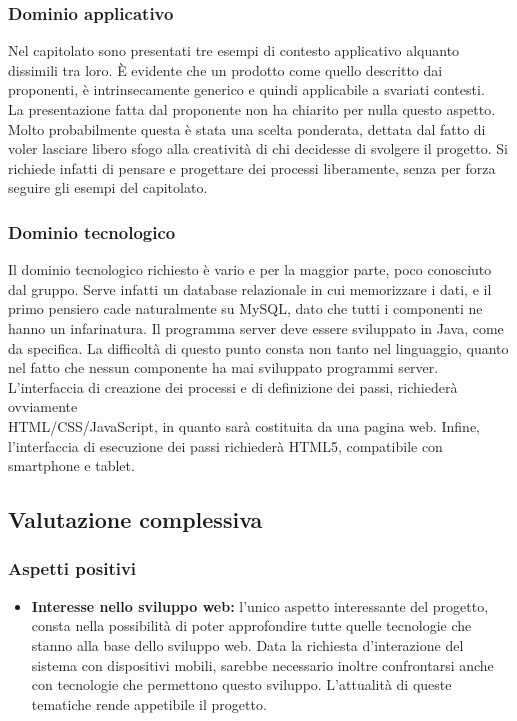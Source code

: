 \subsubsection{Dominio applicativo}
\label{dominioapp4}
Nel capitolato sono presentati tre esempi di contesto applicativo alquanto dissimili tra loro. \`E evidente che un prodotto come quello descritto dai proponenti, è intrinsecamente generico e quindi applicabile a svariati contesti.
\\La presentazione fatta dal proponente non ha chiarito per nulla questo aspetto. Molto probabilmente questa è stata una scelta ponderata, dettata dal fatto di voler lasciare libero sfogo alla creatività di chi decidesse di svolgere il progetto. Si richiede infatti di pensare e progettare dei processi liberamente, senza per forza seguire gli esempi del capitolato.

\subsubsection{Dominio tecnologico}
\label{dominiotec4}
Il dominio tecnologico richiesto è vario e per la maggior parte, poco conosciuto dal gruppo. Serve infatti un database relazionale in cui memorizzare i dati, e il primo pensiero cade naturalmente su MySQL, dato che tutti i componenti ne hanno un infarinatura. Il programma server deve essere sviluppato in Java, come da specifica. La difficoltà di questo punto consta non tanto nel linguaggio, quanto nel fatto che nessun componente ha mai sviluppato programmi server.
\\L'interfaccia di creazione dei processi e di definizione dei passi, richiederà ovviamente \\ HTML/CSS/JavaScript, in quanto sarà costituita da una pagina web. Infine, l'interfaccia di esecuzione dei passi richiederà HTML5, compatibile con smartphone e tablet.

\subsection{Valutazione complessiva}
\label{valutazione4}
\subsubsection{Aspetti positivi}
\label{aspettipos4}
\begin{itemize}
\item\textbf{Interesse nello sviluppo web:} l'unico aspetto interessante del progetto, consta nella possibilità di poter approfondire tutte quelle tecnologie che stanno alla base dello sviluppo web. Data la richiesta d'interazione del sistema con dispositivi mobili, sarebbe necessario inoltre confrontarsi anche con tecnologie che permettono questo sviluppo. L'attualità di queste tematiche rende appetibile il progetto.
\end{itemize}

